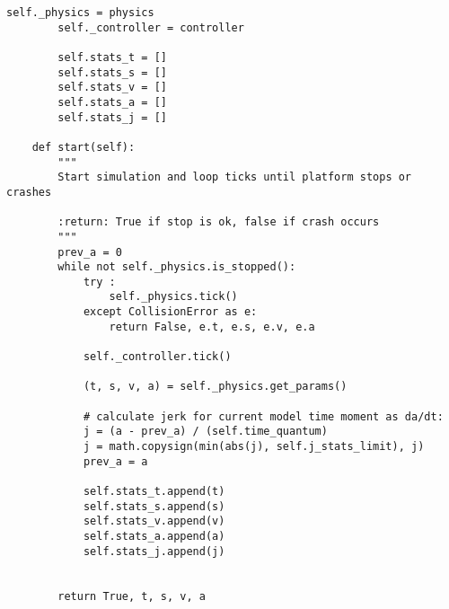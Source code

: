 \begin{lstlisting}[style=pythonstyle,caption={ }, label=lst:func:1]
		self._physics = physics
		self._controller = controller

		self.stats_t = []
		self.stats_s = []
		self.stats_v = []
		self.stats_a = []
		self.stats_j = []

	def start(self):
		"""
		Start simulation and loop ticks until platform stops or crashes

		:return: True if stop is ok, false if crash occurs
		"""
		prev_a = 0
		while not self._physics.is_stopped():
			try :
				self._physics.tick()
			except CollisionError as e:
				return False, e.t, e.s, e.v, e.a

			self._controller.tick()

			(t, s, v, a) = self._physics.get_params()

			# calculate jerk for current model time moment as da/dt:
			j = (a - prev_a) / (self.time_quantum)
			j = math.copysign(min(abs(j), self.j_stats_limit), j)
			prev_a = a

			self.stats_t.append(t)
			self.stats_s.append(s)
			self.stats_v.append(v)
			self.stats_a.append(a)
			self.stats_j.append(j)


		return True, t, s, v, a
\end{lstlisting}